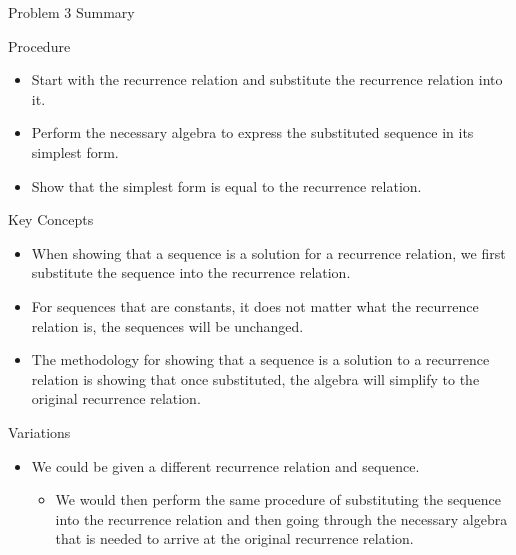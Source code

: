 \begin{summary}{Problem 3 Summary}
    \begin{statement}{Procedure}
        \begin{itemize}
            \item Start with the recurrence relation and substitute the recurrence relation into it.
            \item Perform the necessary algebra to express the substituted sequence in its simplest form.
            \item Show that the simplest form is equal to the recurrence relation.
        \end{itemize}
    \end{statement}
    \begin{statement}{Key Concepts}
        \begin{itemize}
            \item When showing that a sequence is a solution for a recurrence relation, we first substitute the sequence into the recurrence relation.
            \item For sequences that are constants, it does not matter what the recurrence relation is, the sequences will be unchanged.
            \item The methodology for showing that a sequence is a solution to a recurrence relation is showing that once substituted, the algebra will simplify to the original recurrence relation.
        \end{itemize}
    \end{statement}
    \begin{statement}{Variations}
        \begin{itemize}
            \item We could be given a different recurrence relation and sequence.
            \begin{itemize}
                \item We would then perform the same procedure of substituting the sequence into the recurrence relation and then going through the necessary algebra that is needed to arrive at the
                original recurrence relation.
            \end{itemize}
        \end{itemize}
    \end{statement}
\end{summary}

